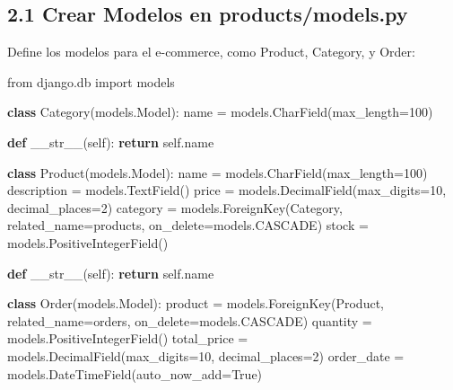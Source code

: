 \documentclass[
  a4paper,
  DIV=11,
  numbers=noendperiod,
  onepage,
  openany]{scrreprt}
\newenvironment{Shaded}{\begin{snugshade}}{\end{snugshade}}
\newcommand{\ControlFlowTok}[1]{\textcolor[rgb]{0.00,0.23,0.31}{\textbf{#1}}}
\newcommand{\DecValTok}[1]{\textcolor[rgb]{0.68,0.00,0.00}{#1}}
\newcommand{\FunctionTok}[1]{\textcolor[rgb]{0.28,0.35,0.67}{#1}}
\newcommand{\ImportTok}[1]{\textcolor[rgb]{0.00,0.46,0.62}{#1}}
\newcommand{\KeywordTok}[1]{\textcolor[rgb]{0.00,0.23,0.31}{\textbf{#1}}}
\newcommand{\NormalTok}[1]{\textcolor[rgb]{0.00,0.23,0.31}{#1}}
\newcommand{\OperatorTok}[1]{\textcolor[rgb]{0.37,0.37,0.37}{#1}}
\newcommand{\StringTok}[1]{\textcolor[rgb]{0.13,0.47,0.30}{#1}}
\newcommand{\VariableTok}[1]{\textcolor[rgb]{0.07,0.07,0.07}{#1}}
\begin{document}
\begin{tcolorbox}
\subsection{2.1 Crear Modelos en
products/models.py}\label{crear-modelos-en-productsmodels.py}

Define los modelos para el e-commerce, como Product, Category, y Order:

\begin{Shaded}
\begin{Highlighting}[]
\ImportTok{from}\NormalTok{ django.db }\ImportTok{import}\NormalTok{ models}

\KeywordTok{class}\NormalTok{ Category(models.Model):}
\NormalTok{    name }\OperatorTok{=}\NormalTok{ models.CharField(max\_length}\OperatorTok{=}\DecValTok{100}\NormalTok{)}

    \KeywordTok{def} \FunctionTok{\_\_str\_\_}\NormalTok{(}\VariableTok{self}\NormalTok{):}
        \ControlFlowTok{return} \VariableTok{self}\NormalTok{.name}

\KeywordTok{class}\NormalTok{ Product(models.Model):}
\NormalTok{    name }\OperatorTok{=}\NormalTok{ models.CharField(max\_length}\OperatorTok{=}\DecValTok{100}\NormalTok{)}
\NormalTok{    description }\OperatorTok{=}\NormalTok{ models.TextField()}
\NormalTok{    price }\OperatorTok{=}\NormalTok{ models.DecimalField(max\_digits}\OperatorTok{=}\DecValTok{10}\NormalTok{, decimal\_places}\OperatorTok{=}\DecValTok{2}\NormalTok{)}
\NormalTok{    category }\OperatorTok{=}\NormalTok{ models.ForeignKey(Category, related\_name}\OperatorTok{=}\StringTok{\textquotesingle{}products\textquotesingle{}}\NormalTok{, on\_delete}\OperatorTok{=}\NormalTok{models.CASCADE)}
\NormalTok{    stock }\OperatorTok{=}\NormalTok{ models.PositiveIntegerField()}

    \KeywordTok{def} \FunctionTok{\_\_str\_\_}\NormalTok{(}\VariableTok{self}\NormalTok{):}
        \ControlFlowTok{return} \VariableTok{self}\NormalTok{.name}

\KeywordTok{class}\NormalTok{ Order(models.Model):}
\NormalTok{    product }\OperatorTok{=}\NormalTok{ models.ForeignKey(Product, related\_name}\OperatorTok{=}\StringTok{\textquotesingle{}orders\textquotesingle{}}\NormalTok{, on\_delete}\OperatorTok{=}\NormalTok{models.CASCADE)}
\NormalTok{    quantity }\OperatorTok{=}\NormalTok{ models.PositiveIntegerField()}
\NormalTok{    total\_price }\OperatorTok{=}\NormalTok{ models.DecimalField(max\_digits}\OperatorTok{=}\DecValTok{10}\NormalTok{, decimal\_places}\OperatorTok{=}\DecValTok{2}\NormalTok{)}
\NormalTok{    order\_date }\OperatorTok{=}\NormalTok{ models.DateTimeField(auto\_now\_add}\OperatorTok{=}\VariableTok{True}\NormalTok{)}


\end{Highlighting}
\end{Shaded}
\end{tcolorbox}
\end{document}
